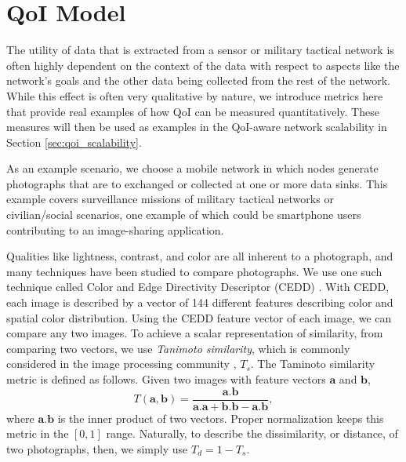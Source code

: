 
\section{QoI Model}
\label{sec:qoi_model}

The utility of data that is extracted from a sensor or military tactical network is often highly dependent on the context of the data with respect to aspects like the network's goals and the other data being collected from the rest of the network.  While this effect is often very qualitative by nature, we introduce metrics here that provide real examples of how QoI can be measured quantitatively.  These measures will then be used as examples in the QoI-aware network scalability in Section \ref{sec:qoi_scalability}.  

As an example scenario, we choose a mobile network in which nodes generate photographs that are to exchanged or collected at one or more data sinks.  This example covers surveillance missions of military tactical networks or civilian/social scenarios, one example of which could be smartphone users contributing to an image-sharing application.  

Qualities like lightness, contrast, and color are all inherent to a photograph, and many techniques have been studied to compare photographs.  We use one such technique called Color and Edge Directivity Descriptor (CEDD) \cite{2008cedd}.  With CEDD, each image is described by a vector of 144 different features describing color and spatial color distribution.  Using the CEDD feature vector of each image, we can compare any two images.  To achieve a scalar representation of similarity, from comparing two vectors, we use \emph{Tanimoto similarity}, which is commonly considered in the image processing community \cite{tanimoto}, $T_s$. The Taminoto similarity metric is defined as follows. Given two images with feature vectors $\mathbf{a}$ and $\mathbf{b}$,
  \begin{equation}
  T(\mathbf{a,b})=\frac{\mathbf{a.b}}{\mathbf{a.a+b.b-a.b}},
  \end{equation}
where $\mathbf{a.b}$ is the inner product of two vectors. Proper normalization keeps this metric in the $[0,1]$ range. Naturally, to describe the dissimilarity, or distance, of two photographs, then, we simply use $T_d = 1 - T_s$.

